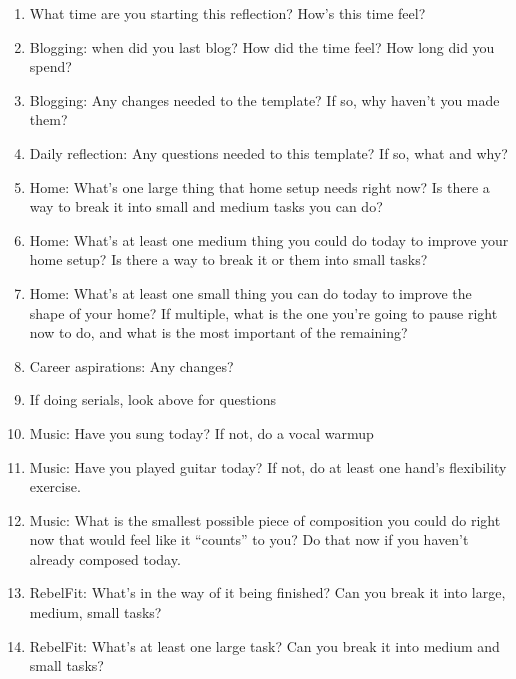 \documentclass[12pt]{article}
\newcommand{\say}[1]{``#1''}
\renewcommand{\,}{\textsuperscript{,}}
\begin{document}
\begin{enumerate}

\item What time are you starting this reflection? How's this time feel?

\item Blogging: when did you last blog? How did the time feel? How long did you spend?

\item Blogging: Any changes needed to the template? If so, why haven't you made them?

\item Daily reflection: Any questions needed to this template? If so, what and why?

\item Home: What's one large thing that home setup needs right now? Is there a way to break it into small and medium tasks you can do?

\item Home: What's at least one medium thing you could do today to improve your home setup? Is there a way to break it or them into small tasks?

\item Home: What's at least one small thing you can do today to improve the shape of your home? If multiple, what is the one you're going to pause right now to do, and what is the most important of the remaining?

\item Career aspirations: Any changes?

\item If doing serials, look above for questions

\item Music: Have you sung today? If not, do a vocal warmup

\item Music: Have you played guitar today? If not, do at least one hand's flexibility exercise.

\item Music: What is the smallest possible piece of composition you could do right now that would feel like it \say{counts} to you? Do that now if you haven't already composed today.

\item RebelFit: What's in the way of it being finished? Can you break it into large, medium, small tasks?

\item RebelFit: What's at least one large task? Can you break it into medium and small tasks?


\end{enumerate}
\end{document}
